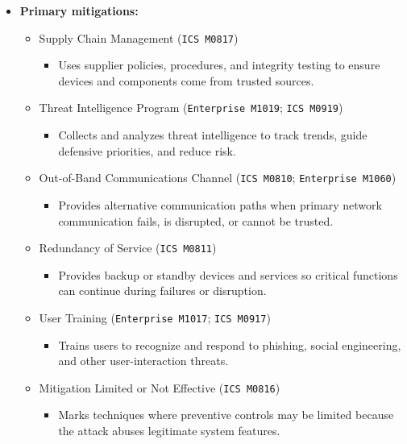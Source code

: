 \documentclass[10pt,a4paper,oneside]{report}
\begin{document}
\begin{itemize}
\item \textbf{Primary mitigations:}
\begin{itemize}
\item Supply Chain Management (\texttt{ICS M0817})
\begin{itemize}
\item Uses supplier policies, procedures, and integrity testing to ensure devices and components come from trusted sources.
\end{itemize}
\item Threat Intelligence Program (\texttt{Enterprise M1019}; \texttt{ICS M0919})
\begin{itemize}
\item Collects and analyzes threat intelligence to track trends, guide defensive priorities, and reduce risk.
\end{itemize}
\item Out-of-Band Communications Channel (\texttt{ICS M0810}; \texttt{Enterprise M1060})
\begin{itemize}
\item Provides alternative communication paths when primary network communication fails, is disrupted, or cannot be trusted.
\end{itemize}
\item Redundancy of Service (\texttt{ICS M0811})
\begin{itemize}
\item Provides backup or standby devices and services so critical functions can continue during failures or disruption.
\end{itemize}
\item User Training (\texttt{Enterprise M1017}; \texttt{ICS M0917})
\begin{itemize}
\item Trains users to recognize and respond to phishing, social engineering, and other user-interaction threats.
\end{itemize}
\item Mitigation Limited or Not Effective (\texttt{ICS M0816})
\begin{itemize}
\item Marks techniques where preventive controls may be limited because the attack abuses legitimate system features.
\end{itemize}
\end{itemize}
\end{itemize}
\end{document}
